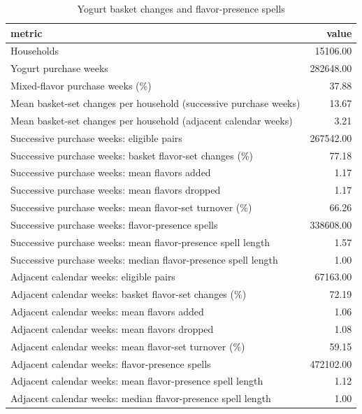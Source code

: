 \begin{table}
\caption{Yogurt basket changes and flavor-presence spells}
\begin{tabular}{lr}
\toprule
metric & value \\
\midrule
Households & 15106.00 \\
Yogurt purchase weeks & 282648.00 \\
Mixed-flavor purchase weeks (\%) & 37.88 \\
Mean basket-set changes per household (successive purchase weeks) & 13.67 \\
Mean basket-set changes per household (adjacent calendar weeks) & 3.21 \\
Successive purchase weeks: eligible pairs & 267542.00 \\
Successive purchase weeks: basket flavor-set changes (\%) & 77.18 \\
Successive purchase weeks: mean flavors added & 1.17 \\
Successive purchase weeks: mean flavors dropped & 1.17 \\
Successive purchase weeks: mean flavor-set turnover (\%) & 66.26 \\
Successive purchase weeks: flavor-presence spells & 338608.00 \\
Successive purchase weeks: mean flavor-presence spell length & 1.57 \\
Successive purchase weeks: median flavor-presence spell length & 1.00 \\
Adjacent calendar weeks: eligible pairs & 67163.00 \\
Adjacent calendar weeks: basket flavor-set changes (\%) & 72.19 \\
Adjacent calendar weeks: mean flavors added & 1.06 \\
Adjacent calendar weeks: mean flavors dropped & 1.08 \\
Adjacent calendar weeks: mean flavor-set turnover (\%) & 59.15 \\
Adjacent calendar weeks: flavor-presence spells & 472102.00 \\
Adjacent calendar weeks: mean flavor-presence spell length & 1.12 \\
Adjacent calendar weeks: median flavor-presence spell length & 1.00 \\
\bottomrule
\end{tabular}
\end{table}

